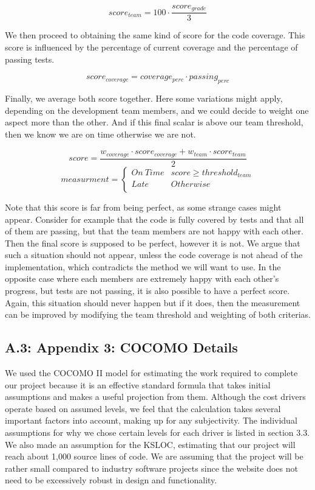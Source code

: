 \documentclass[]{article}
\begin{document}
$$
score_{team} = 100 \cdot \frac{score_{grade}}{3} 
$$

We then proceed to obtaining the same kind of score for the code coverage. This score is influenced by the percentage of current coverage and the percentage of passing tests.

$$
score_{coverage} = coverage_{perc} \cdot passing_{perc}
$$

Finally, we average both score together. Here some variations might apply, depending on the development team members, and we could decide to weight one aspect more than the other. And if this final scalar is above our team threshold, then we know we are on time otherwise we are not.

$$
score = \frac{w_{coverage} \cdot score_{coverage} + w_{team} \cdot score_{team}}{2}
$$
$$
measurment = 
\begin{cases}
On\ Time &  score \geq threshold_{team} \\
Late & Otherwise \\
\end{cases}
$$

Note that this score is far from being perfect, as some strange cases might appear. Consider for example that the code is fully covered by tests and that all of them are passing, but that the team members are not happy with each other. Then the final score is supposed to be perfect, however it is not. We argue that such a situation should not appear, unless the code coverage is not ahead of the implementation, which contradicts the method we will want to use. In the opposite case where each members are extremely happy with each other's progress, but tests are not passing, it is also possible to have a perfect score. Again, this situation should never happen but if it does, then the measurement can be improved by modifying the team threshold and weighting of both criterias.


\subsection{A.3: Appendix 3: COCOMO
Details}\label{a.3-appendix-3-cocomo-details}

We used the COCOMO II model for estimating the work required to complete
our project because it is an effective standard formula that takes
initial assumptions and makes a useful projection from them. Although
the cost drivers operate based on assumed levels, we feel that the
calculation takes several important factors into account, making up for
any subjectivity. The individual assumptions for why we chose certain
levels for each driver is listed in section 3.3. We also made an
assumption for the KSLOC, estimating that our project will reach about
1,000 source lines of code. We are assuming that the project will be
rather small compared to industry software projects since the website
does not need to be excessively robust in design and functionality.
\end{document}
